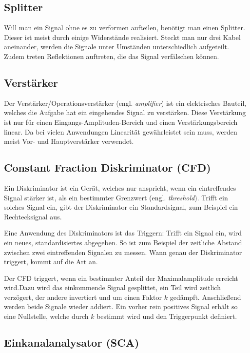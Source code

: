 \subsection{Splitter}

Will man ein Signal ohne es zu verformen aufteilen, benötigt man einen
Splitter. Dieser ist meist durch einige Widerstände realisiert. Steckt man nur
drei Kabel aneinander, werden die Signale unter Umständen unterschiedlich
aufgeteilt. Zudem treten Reflektionen auftreten, die das Signal verfälschen
können.

\subsection{Verstärker}

Der Verstärker/Operationsverstärker (engl. \emph{amplifier}) ist ein
elektrisches Bauteil, welches die Aufgabe hat ein eingehendes Signal zu
verstärken. Diese Verstärkung ist nur für einen Eingangs-Amplituden-Bereich und
einen Verstärkungsbereich linear. Da bei vielen Anwendungen Linearität
gewährleistet sein muss, werden meist Vor- und Hauptverstärker verwendet.

\subsection{Constant Fraction Diskriminator (CFD)}

Ein Diskriminator ist ein Gerät, welches nur anspricht, wenn ein eintreffendes
Signal stärker ist, als ein bestimmter Grenzwert (engl. \emph{threshold}).
Trifft ein solches Signal ein, gibt der Diskriminator ein Standardsignal, zum
Beispiel ein Rechtecksignal aus.

Eine Anwendung des Diskriminators ist das Triggern: Trifft ein Signal ein, wird
ein neues, standardisiertes abgegeben. So ist zum Beispiel der zeitliche
Abstand zwischen zwei eintreffenden Signalen zu messen. Wann genau der
Diskriminator triggert, kommt auf die Art an.

Der CFD triggert, wenn ein bestimmter Anteil der Maximalamplitude erreicht
wird.Dazu wird das einkommende Signal gesplittet, ein Teil wird zeitlich
verzögert, der andere invertiert und um einen Faktor $k$ gedämpft. Anschließend
werden beide Signale wieder addiert. Ein vorher rein positives Signal erhält so
eine Nullstelle, welche durch $k$ bestimmt wird und den Triggerpunkt definiert.

\subsection{Einkanalanalysator (SCA)}


